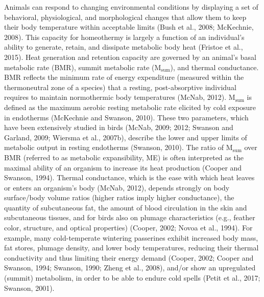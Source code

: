 \documentclass[10pt, twoside]{book} %
\begin{document}
Animals can respond to changing environmental conditions by displaying a set of behavioral, physiological, and morphological changes that allow them to keep their body temperature within acceptable limits (Bush et al., 2008; McKechnie, 2008). This capacity for homeothermy is largely a function of an individual's ability to generate, retain, and dissipate metabolic body heat (Fristoe et al., 2015). Heat generation and retention capacity are governed by an animal's basal metabolic rate (BMR), summit metabolic rate (M$_{\text{sum}}$), and thermal conductance. BMR reflects the minimum rate of energy expenditure (measured within the thermoneutral zone of a species) that a resting, post-absorptive individual requires to maintain normothermic body temperatures (McNab, 2012). M$_{\text{sum}}$ is defined as the maximum aerobic resting metabolic rate elicited by cold exposure in endotherms (McKechnie and Swanson, 2010). These two parameters, which have been extensively studied in birds (McNab, 2009; 2012; Swanson and Garland, 2009; Wiersma et al., 2007b), describe the lower and upper limits of metabolic output in resting endotherms (Swanson, 2010). The ratio of M$_{\text{sum}}$ over BMR (referred to as metabolic expansibility, ME) is often interpreted as the maximal ability of an organism to increase its heat production (Cooper and Swanson, 1994). Thermal conductance, which is the ease with which heat leaves or enters an organism's body (McNab, 2012), depends strongly on body surface/body volume ratios (higher ratios imply higher conductance), the quantity of subcutaneous fat, the amount of blood circulation in the skin and subcutaneous tissues, and for birds also on plumage characteristics (e.g., feather color, structure, and optical properties) (Cooper, 2002; Novoa et al., 1994). For example, many cold-temperate wintering passerines exhibit increased body mass, fat stores, plumage density, and lower body temperatures, reducing their thermal conductivity and thus limiting their energy demand (Cooper, 2002; Cooper and Swanson, 1994; Swanson, 1990; Zheng et al., 2008), and/or show an upregulated (summit) metabolism, in order to be able to endure cold spells (Petit et al., 2017; Swanson, 2001).\\
\end{document}
